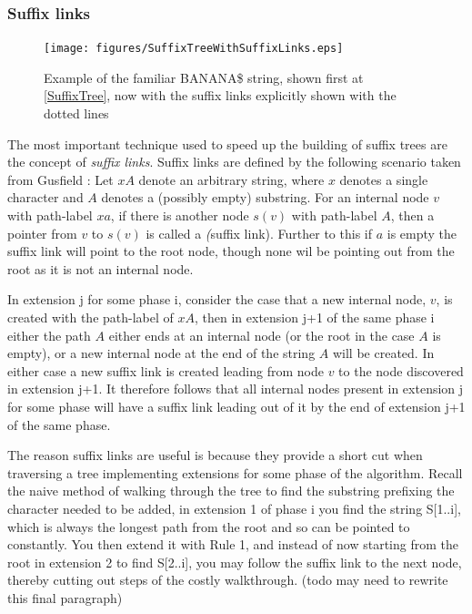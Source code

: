 \documentclass[12pt,twoside,notitlepage]{report}
\begin{document}
					\subsubsection{Suffix links}

\begin{figure}[h]
			\centerline{\texttt{[image: figures/SuffixTreeWithSuffixLinks.eps]}}
			\caption{\label{fig:SuffixLinks} Example of the familiar BANANA\$ string, shown first at \ref{SuffixTree}, now with the suffix links explicitly shown with the dotted lines}
\end{figure}					
					
					The most important technique used to speed up the building of suffix trees are the concept of \emph{suffix links}. Suffix links are defined by the following scenario taken from Gusfield \cite{Gusfield1997}: Let $xA$ denote an arbitrary string, where $x$ denotes a single character and $A$ denotes a (possibly empty) substring. For an internal node $v$ with path-label $xa$, if there is another node $s(v)$ with path-label $A$, then a pointer from $v$ to $s(v)$ is called a \emph(suffix link). Further to this if $a$ is empty the suffix link will point to the root node, though none wil be pointing out from the root as it is not an internal node. 
					
					In extension j for some phase i, consider the case that a new internal node, $v$, is created with the path-label of $xA$, then in extension j+1 of the same phase i either the path $A$ either ends at an internal node (or the root in the case $A$ is empty), or a new internal node at the end of the string $A$ will be created. In either case a new suffix link is created leading from node $v$ to the node discovered in extension j+1. It therefore follows that all internal nodes present in extension j for some phase will have a suffix link leading out of it by the end of extension j+1 of the same phase.
					
					The reason suffix links are useful is because they provide a short cut when traversing a tree implementing extensions for some phase of the algorithm. Recall the naive method of walking through the tree to find the substring prefixing the character needed to be added, in extension 1 of phase i you find the string S[1..i], which is always the longest path from the root and so can be pointed to constantly. You then extend it with Rule 1, and instead of now starting from the root in extension 2 to find S[2..i], you may follow the suffix link to the next node, thereby cutting out steps of the costly walkthrough.
					(todo may need to rewrite this final paragraph)
\end{document}

